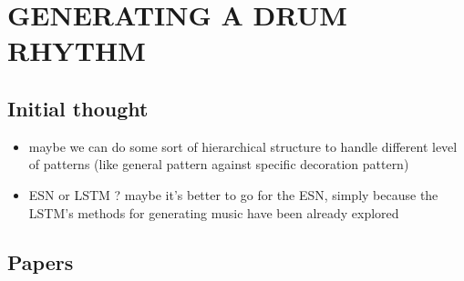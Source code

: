 \documentclass[11pt]{article}
\date{\today}
\title{}
\begin{document}
\tableofcontents

\section{GENERATING A DRUM RHYTHM}
\label{sec:org17a94f6}
\subsection{Initial thought}
\label{sec:org74fea72}
\begin{itemize}
\item maybe we can do some sort of hierarchical structure to handle
different level of patterns (like general pattern against specific
decoration pattern)
\item ESN or LSTM ?
maybe it's better to go for the ESN, simply because the LSTM's
methods for generating music have been already explored
\end{itemize}

\subsection{Papers}
\label{sec:orgdcea7bc}
\end{document}
